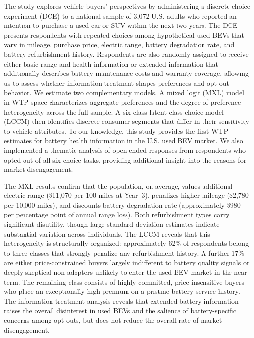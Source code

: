 \documentclass[a4paper,fleqn]{cas-sc}   %
\begin{document}
The study explores vehicle buyers' perspectives by administering a discrete choice experiment (DCE) to a national sample of 3,072 U.S. adults who reported an intention to purchase a used car or SUV within the next two years. The DCE presents respondents with repeated choices among hypothetical used BEVs that vary in mileage, purchase price, electric range, battery degradation rate, and battery refurbishment history. Respondents are also randomly assigned to receive either basic range-and-health information or extended information that additionally describes battery maintenance costs and warranty coverage, allowing us to assess whether information treatment shapes preferences and opt-out behavior. We estimate two complementary models. A mixed logit (MXL) model in WTP space characterizes aggregate preferences and the degree of preference heterogeneity across the full sample. A six-class latent class choice model (LCCM) then identifies discrete consumer segments that differ in their sensitivity to vehicle attributes. To our knowledge, this study provides the first WTP estimates for battery health information in the U.S. used BEV market. We also implemented a thematic analysis of open-ended responses from respondents who opted out of all six choice tasks, providing additional insight into the reasons for market disengagement.

The MXL results confirm that the population, on average, values additional electric range (\$11,070 per 100 miles at Year~3), penalizes higher mileage (\$2,780 per 10,000 miles), and discounts battery degradation rate (approximately \$980 per percentage point of annual range loss). Both refurbishment types carry significant disutility, though large standard deviation estimates indicate substantial variation across individuals. The LCCM reveals that this heterogeneity is structurally organized: approximately 62\% of respondents belong to three classes that strongly penalize any refurbishment history. A further 17\% are either price-constrained buyers largely indifferent to battery quality signals or deeply skeptical non-adopters unlikely to enter the used BEV market in the near term. The remaining class consists of highly committed, price-insensitive buyers who place an exceptionally high premium on a pristine battery service history. The information treatment analysis reveals that extended battery information raises the overall disinterest in used BEVs and the salience of battery-specific concerns among opt-outs, but does not reduce the overall rate of market disengagement. 
\end{document}
